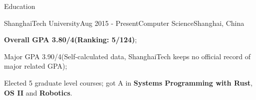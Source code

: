\documentclass{resume} %
\begin{document}

\begin{rSection}{Education}

\begin{rSubsection}
  {ShanghaiTech University}{Aug 2015 - Present}{Computer Science}{Shanghai, China}
    \item \textbf{Overall GPA 3.80/4(Ranking: 5/124)};
    \item Major GPA 3.90/4(Self-calculated data, ShanghaiTech keeps no official record of major related GPA);
    \item Elected 5 graduate level courses; got A in \textbf{Systems Programming with Rust}, \textbf{OS II} and \textbf{Robotics}.
\end{rSubsection}

%
\end{rSection}
\end{document}
